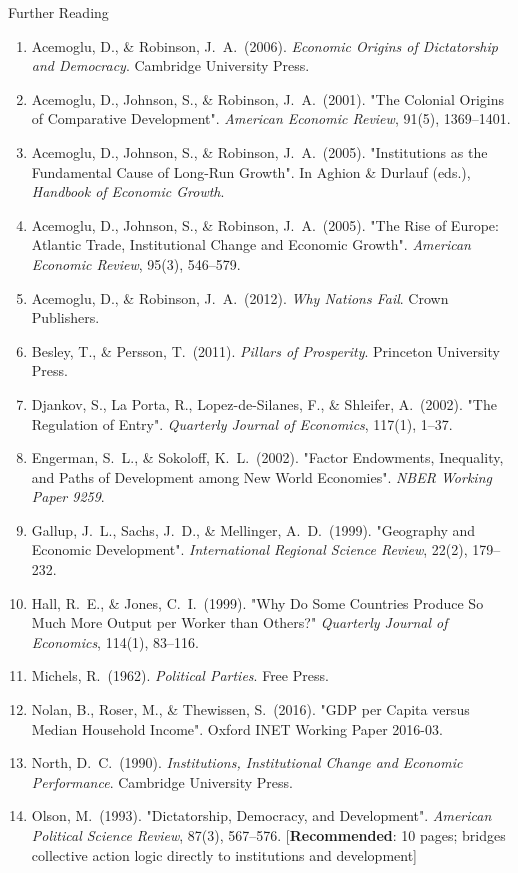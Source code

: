 \documentclass[10pt]{beamer}
\begin{document}
\begin{frame}[allowframebreaks]{Further Reading}
\footnotesize
\begin{enumerate}
\item Acemoglu, D., \& Robinson, J.\ A.\ (2006). \emph{Economic Origins of Dictatorship and Democracy}. Cambridge University Press.
\item Acemoglu, D., Johnson, S., \& Robinson, J.\ A.\ (2001). "The Colonial Origins of Comparative Development". \emph{American Economic Review}, 91(5), 1369--1401.
\item Acemoglu, D., Johnson, S., \& Robinson, J.\ A.\ (2005). "Institutions as the Fundamental Cause of Long-Run Growth". In Aghion \& Durlauf (eds.), \emph{Handbook of Economic Growth}.
\item Acemoglu, D., Johnson, S., \& Robinson, J.\ A.\ (2005). "The Rise of Europe: Atlantic Trade, Institutional Change and Economic Growth". \emph{American Economic Review}, 95(3), 546--579.
\item Acemoglu, D., \& Robinson, J.\ A.\ (2012). \emph{Why Nations Fail}. Crown Publishers.
\item Besley, T., \& Persson, T.\ (2011). \emph{Pillars of Prosperity}. Princeton University Press.
\item Djankov, S., La Porta, R., Lopez-de-Silanes, F., \& Shleifer, A.\ (2002). "The Regulation of Entry". \emph{Quarterly Journal of Economics}, 117(1), 1--37.
\item Engerman, S.\ L., \& Sokoloff, K.\ L.\ (2002). "Factor Endowments, Inequality, and Paths of Development among New World Economies". \emph{NBER Working Paper 9259}.
\item Gallup, J.\ L., Sachs, J.\ D., \& Mellinger, A.\ D.\ (1999). "Geography and Economic Development". \emph{International Regional Science Review}, 22(2), 179--232.
\item Hall, R.\ E., \& Jones, C.\ I.\ (1999). "Why Do Some Countries Produce So Much More Output per Worker than Others?" \emph{Quarterly Journal of Economics}, 114(1), 83--116.
\item Michels, R.\ (1962). \emph{Political Parties}. Free Press.
\item Nolan, B., Roser, M., \& Thewissen, S.\ (2016). "GDP per Capita versus Median Household Income". Oxford INET Working Paper 2016-03.
\item North, D.\ C.\ (1990). \emph{Institutions, Institutional Change and Economic Performance}. Cambridge University Press.
\item Olson, M.\ (1993). "Dictatorship, Democracy, and Development". \emph{American Political Science Review}, 87(3), 567--576. [\textbf{Recommended}: 10 pages; bridges collective action logic directly to institutions and development]

\end{enumerate}
\end{frame}
\end{document}
